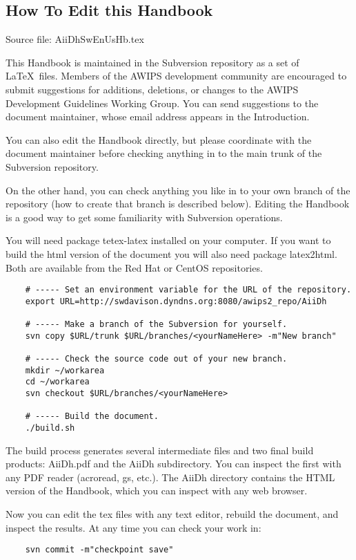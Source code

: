 
\subsection{How To Edit this Handbook}
 
Source file: AiiDhSwEnUsHb.tex

This Handbook is maintained in the Subversion
repository as a set of \LaTeX\ files.
Members of the AWIPS development community are encouraged to
submit suggestions for additions, deletions, or changes to
the AWIPS Development Guidelines Working Group.  You can 
send suggestions to 
the document maintainer, whose email address appears in the
Introduction.
 
You can also edit the Handbook directly, but please
coordinate with the document maintainer before checking
anything in to the main trunk of the Subversion repository.

On the other hand, you can check anything you like in to
your own branch of the repository (how to create that branch
is described below).  Editing the Handbook is a good way to
get some familiarity with Subversion operations.
 
You will need package tetex-latex installed on your
computer.  If you want to build the html version of the
document you will also need package latex2html.  Both are
available from the Red Hat or CentOS repositories.

\begin{verbatim}
    # ----- Set an environment variable for the URL of the repository.
    export URL=http://swdavison.dyndns.org:8080/awips2_repo/AiiDh

    # ----- Make a branch of the Subversion for yourself.
    svn copy $URL/trunk $URL/branches/<yourNameHere> -m"New branch"

    # ----- Check the source code out of your new branch.
    mkdir ~/workarea
    cd ~/workarea
    svn checkout $URL/branches/<yourNameHere>

    # ----- Build the document.
    ./build.sh
\end{verbatim}

The build process generates several intermediate files and two
final build products: AiiDh.pdf and the AiiDh subdirectory.
You can inspect the first with any PDF reader (acroread, gs,
etc.).  The AiiDh directory contains the HTML version of the
Handbook, which you can inspect with any web browser.

Now you can edit the tex files with any text editor, rebuild
the document, and inspect the results.  At any time you can
check your work in:
\begin{verbatim}
    svn commit -m"checkpoint save"
\end{verbatim}


